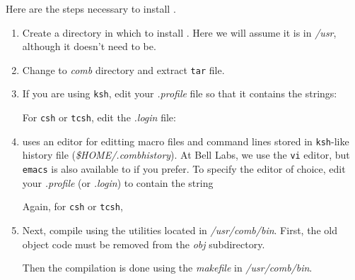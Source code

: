 Here are the steps necessary to install \C.
\begin{enumerate}
 \item Create a directory in which to install \C. Here we will
 assume it is in {\sl /usr}, although it doesn't need to be.
 \item Change to {\sl comb\/} directory and extract {\tt tar} file.
 \item If you are using {\tt ksh}, edit your {\sl .profile\/} 
 file so that it contains the strings:
\noindent
For {\tt csh} or {\tt tcsh}, edit the {\sl .login\/} file:
 \item \COMB uses an editor for editting macro files and command lines stored
 in {\tt ksh}-like history file ({\sl {\$}HOME/.combhistory}).  At Bell Labs, 
 we use the {\tt vi} editor, but {\tt emacs} is also available to \COMB if 
 you prefer.  To specify the editor of choice, edit your {\sl .profile\/} 
 (or {\sl .login\/}) to contain the string
\noindent
Again, for {\tt csh} or {\tt tcsh},
 \item Next, compile \COMB using the utilities located in {\sl /usr/comb/bin}. 
\noindent
First, the old object code must be removed from the {\sl obj\/} subdirectory.
\noindent
Then the compilation is done using the {\sl makefile\/} in {\sl /usr/comb/bin}.


\end{enumerate}
